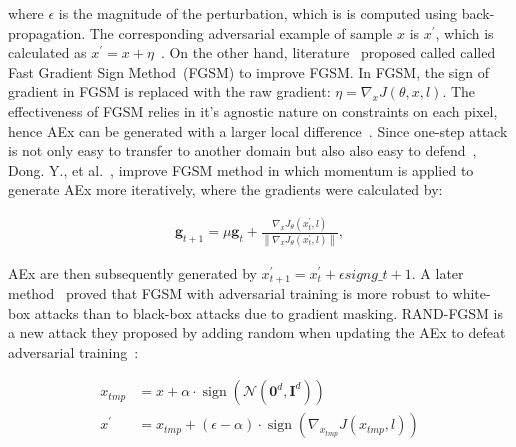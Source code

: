 \hspace*{3.5mm} where $\epsilon$ is the magnitude of the perturbation, which is is computed using back-propagation. The corresponding adversarial example of sample $x$ is $x^{\prime}$, which is calculated as $x^{\prime}=x+\eta$~\cite{yuan2019adversarial}. On the other hand, literature~\cite{rozsa2016adversarial} proposed called called Fast Gradient Sign Method~(FGSM) to improve FGSM. In FGSM, the sign of gradient in FGSM is replaced with the raw gradient: $\eta=\nabla_{x} J(\theta, x, l)$. The effectiveness of FGSM relies in it's agnostic nature on constraints on each pixel, hence AEx can be generated with a larger local difference~\cite{yuan2019adversarial}. Since one-step attack is not only easy to transfer to another domain but also also easy to defend~\cite{yuan2019adversarial}, Dong. Y., et al.~\cite{dong2018boosting}, improve FGSM method in which momentum is applied to generate AEx more iteratively, where the gradients were calculated by:

\vspace{-6mm}
\begin{align}
    \mathbf{g}_{t+1}=\mu \mathbf{g}_{t}+\frac{\nabla_{x} J_{\theta}\left(x_{t}^{\prime}, l\right)}{\left\|\nabla_{x} J_{\theta}\left(x_{t}^{\prime}, l\right)\right\|},
\end{align}

\hspace*{3.5mm} AEx are then subsequently generated by   $x_{t+1}^{\prime}=x_{t}^{\prime}+ \epsilon sign g\_{t+1}$. A later method~\cite{tramer2017ensemble} proved that FGSM with adversarial training is more robust to white-box attacks than to black-box attacks due to gradient masking. RAND-FGSM is a new attack they proposed by adding random when updating the AEx to defeat adversarial training~\cite{yuan2019adversarial}:

\vspace{-6mm}
\begin{align}
    x_{t m p} &=x+\alpha \cdot \operatorname{sign}\left(\mathcal{N}\left(\mathbf{0}^{d}, \mathbf{I}^{d}\right)\right) \\
    x^{\prime} &=x_{t m p}+(\epsilon-\alpha) \cdot \operatorname{sign}\left(\nabla_{x_{t m p}} J\left(x_{t m p}, l\right)\right)
\end{align}
    
